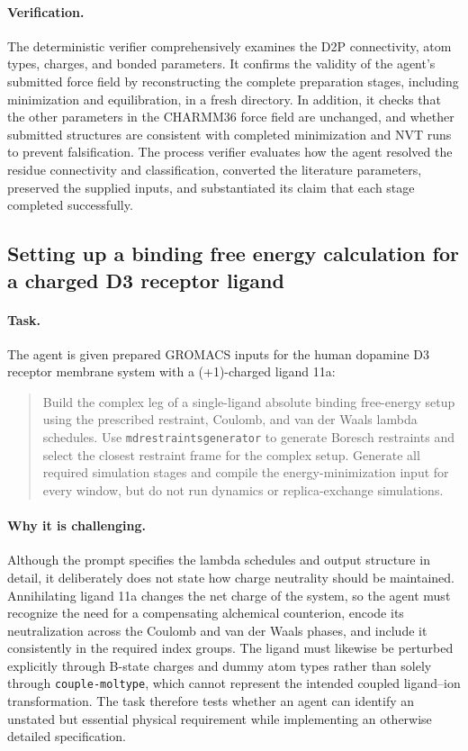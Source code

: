 \documentclass[11pt,a4paper]{article}
\begin{document}
\paragraph{Verification.}
The deterministic verifier comprehensively examines the D2P connectivity, atom types, charges, and bonded parameters. It confirms the validity of the agent's submitted force field by reconstructing the complete preparation stages, including minimization and equilibration, in a fresh directory. In addition, it checks that the other parameters in the CHARMM36 force field are unchanged, and whether submitted structures are consistent with completed minimization and NVT runs to prevent falsification. The process verifier evaluates how the agent resolved the residue connectivity and classification, converted the literature parameters, preserved the supplied inputs, and substantiated its claim that each stage completed successfully.

\subsection{Setting up a binding free energy calculation for a charged D3 receptor ligand}
\label{app:task39}

\paragraph{Task.}

The agent is given prepared GROMACS inputs for the human dopamine D3 receptor membrane system with a (+1)-charged ligand 11a:

\begin{quote}
Build the complex leg of a single-ligand absolute binding free-energy setup using the prescribed restraint, Coulomb, and van der Waals lambda schedules. Use \texttt{mdrestraintsgenerator} to generate Boresch restraints and select the closest restraint frame for the complex setup. Generate all required simulation stages and compile the energy-minimization input for every window, but do not run dynamics or replica-exchange simulations.
\end{quote}

\paragraph{Why it is challenging.}
Although the prompt specifies the lambda schedules and output structure in detail, it deliberately does not state how charge neutrality should be maintained. Annihilating ligand 11a changes the net charge of the system, so the agent must recognize the need for a compensating alchemical counterion, encode its neutralization across the Coulomb and van der Waals phases, and include it consistently in the required index groups. The ligand must likewise be perturbed explicitly through B-state charges and dummy atom types rather than solely through \texttt{couple-moltype}, which cannot represent the intended coupled ligand--ion transformation. The task therefore tests whether an agent can identify an unstated but essential physical requirement while implementing an otherwise detailed specification.
\end{document}

